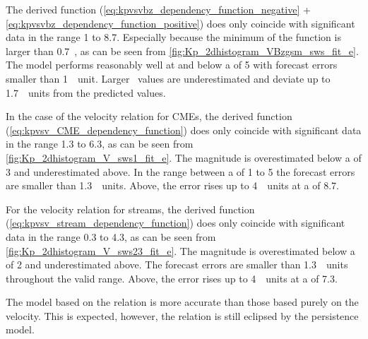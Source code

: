 The derived \vBz{} function (\ref{eq:kpvsvbz_dependency_function_negative} + \ref{eq:kpvsvbz_dependency_function_positive}) does only coincide with significant data in the \Kp{} range 1 to 8.7. Especially because the minimum of the \vBz{} function is larger than 0.7~\Kp{}, as can be seen from \autoref{fig:Kp_2dhistogram_VBzgsm_sws_fit_e}. The model performs reasonably well at and below a \Kp{} of 5 with forecast errors smaller than 1~\Kp~unit. Larger \Kp~values are underestimated and deviate up to 1.7~\Kp~units from the predicted values.

In the case of the velocity relation for CMEs, the derived function (\ref{eq:kpvsv_CME_dependency_function}) does only coincide with significant data in the \Kp{} range 1.3 to 6.3, as can be seen from \autoref{fig:Kp_2dhistogram_V_sws1_fit_e}. The magnitude is overestimated below a \Kp{} of 3 and underestimated above. In the range between a \Kp{} of 1 to 5 the forecast errors are smaller than 1.3~\Kp~units. Above, the error rises up to 4~\Kp~units at a \Kp{} of 8.7.

For the velocity relation for streams, the derived function (\ref{eq:kpvsv_stream_dependency_function}) does only coincide with significant data in the \Kp{} range 0.3 to 4.3, as can be seen from \autoref{fig:Kp_2dhistogram_V_sws23_fit_e}. The magnitude is overestimated below a \Kp{} of 2 and underestimated above. The forecast errors are smaller than 1.3~\Kp~units throughout the valid range. Above, the error rises up to 4~\Kp~units at a \Kp{} of 7.3.

The model based on the \vBz{} relation is more accurate than those based purely on the velocity. This is expected, however, the \vBz{} relation is still eclipsed by the persistence model.\\

